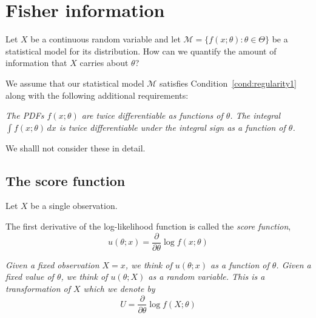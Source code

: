 
\section{Fisher information}\label{sec:fisher}


Let $X$ be a continuous random variable and let $\mathcal{M}=\{f(x;\theta):\theta\in\Theta\}$ be a statistical model for its distribution. How can we quantify the amount of information that $X$ carries about $\theta$?

We assume that our statistical model $\mathcal{M}$ satisfies Condition~\ref{cond:regularity1} along with the following additional requirements:
\begin{condition}\label{cond:regularity2}
\ben
\setcounter{enumi}{3}
\it The PDFs $f(x;\theta)$ are twice differentiable as functions of $\theta$.
\it The integral $\displaystyle\int f(x;\theta)\,dx$ is twice differentiable under the integral sign as a function of $\theta$.
\een
\end{condition}
We shalll not consider these in detail.

\subsection{The score function}

Let $X$ be a single observation.%

\begin{definition}
The first derivative of the log-likelihood function is called the \emph{score function}, 
\[
u(\theta;x) = \frac{\partial}{\partial\theta}\log f(x;\theta)
\]
\end{definition}

\bit
\it Given a fixed observation $X=x$, we think of $u(\theta;x)$ as a function of $\theta$.
\it Given a fixed value of $\theta$, we think of $u(\theta;X)$ as a random variable. This is a transformation of $X$ which we denote by 
	\[
		U = \frac{\partial}{\partial\theta}\log f(X;\theta)
	\]
\eit
%


